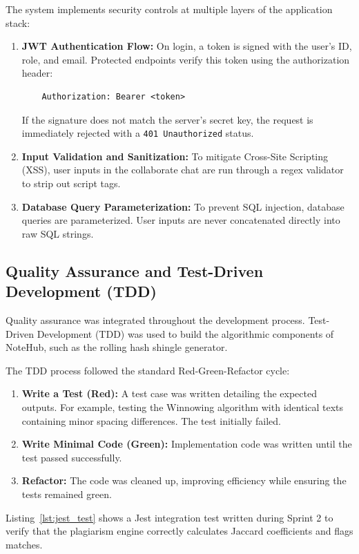 \documentclass[12,Times new Roman,a4paper]{report}
\begin{document}
The system implements security controls at multiple layers of the application stack:
\begin{enumerate}
    \item \textbf{JWT Authentication Flow:} On login, a token is signed with the user's ID, role, and email. Protected endpoints verify this token using the authorization header:
\begin{verbatim}
    Authorization: Bearer <token>
\end{verbatim}
    If the signature does not match the server's secret key, the request is immediately rejected with a \texttt{401 Unauthorized} status.
    \item \textbf{Input Validation and Sanitization:} To mitigate Cross-Site Scripting (XSS), user inputs in the collaborate chat are run through a regex validator to strip out script tags.
    \item \textbf{Database Query Parameterization:} To prevent SQL injection, database queries are parameterized. User inputs are never concatenated directly into raw SQL strings.
\end{enumerate}

\subsection{Quality Assurance and Test-Driven Development (TDD)}

Quality assurance was integrated throughout the development process. Test-Driven Development (TDD) was used to build the algorithmic components of NoteHub, such as the rolling hash shingle generator.

The TDD process followed the standard Red-Green-Refactor cycle:
\begin{enumerate}
    \item \textbf{Write a Test (Red):} A test case was written detailing the expected outputs. For example, testing the Winnowing algorithm with identical texts containing minor spacing differences. The test initially failed.
    \item \textbf{Write Minimal Code (Green):} Implementation code was written until the test passed successfully.
    \item \textbf{Refactor:} The code was cleaned up, improving efficiency while ensuring the tests remained green.
\end{enumerate}

Listing~\ref{lst:jest_test} shows a Jest integration test written during Sprint 2 to verify that the plagiarism engine correctly calculates Jaccard coefficients and flags matches.
\end{document}
